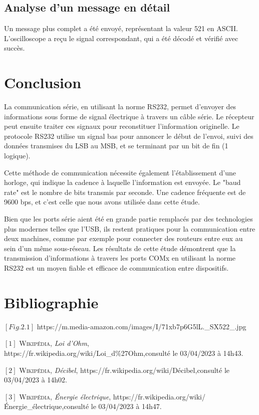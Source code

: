 \documentclass[12pt, letterpaper]{report}
\begin{document}
\section{Analyse d'un message en détail}
Un message plus complet a été envoyé, représentant la valeur 521 en ASCII. L'oscilloscope a reçu le signal correspondant, qui a été décodé et vérifié avec succès.

\chapter{Conclusion}
La communication série, en utilisant la norme RS232, permet d'envoyer des informations sous forme de signal électrique à travers un câble série. Le récepteur peut ensuite traiter ces signaux pour reconstituer l'information originelle. Le protocole RS232 utilise un signal bas pour annoncer le début de l'envoi, suivi des données transmises du LSB au MSB, et se terminant par un bit de fin (1 logique).

Cette méthode de communication nécessite également l'établissement d'une horloge, qui indique la cadence à laquelle l'information est envoyée. Le "baud rate" est le nombre de bits transmis par seconde. Une cadence fréquente est de 9600 bps, et c'est celle que nous avons utilisée dans cette étude.

Bien que les ports série aient été en grande partie remplacés par des technologies plus modernes telles que l'USB, ils restent pratiques pour la communication entre deux machines, comme par exemple pour connecter des routeurs entre eux au sein d'un même sous-réseau. Les résultats de cette étude démontrent que la transmission d'informations à travers les ports COMx en utilisant la norme RS232 est un moyen fiable et efficace de communication entre dispositifs.
\chapter{Bibliographie}

$[Fig.2.1]$ {https://m.media-amazon.com/images/I/71xb7p6G5lL.\_SX522\_.jpg}

$[1]$ \textsc{Wikipédia}, \emph{Loi d'Ohm}, \newline
{https://fr.wikipedia.org/wiki/Loi\_d\%27Ohm},\quad consulté le 03/04/2023 à 14h43.
\smallskip

$[2]$ \textsc{Wikipédia}, \emph{Décibel}, \newline
{https://fr.wikipedia.org/wiki/Décibel},\quad consulté le 03/04/2023 à 14h02.
\smallskip

$[3]$ \textsc{Wikipédia}, \emph{Énergie électrique},\newline
{https://fr.wikipedia.org/wiki/Énergie\_électrique},\quad consulté le 03/04/2023 à 14h47.
\end{document}
